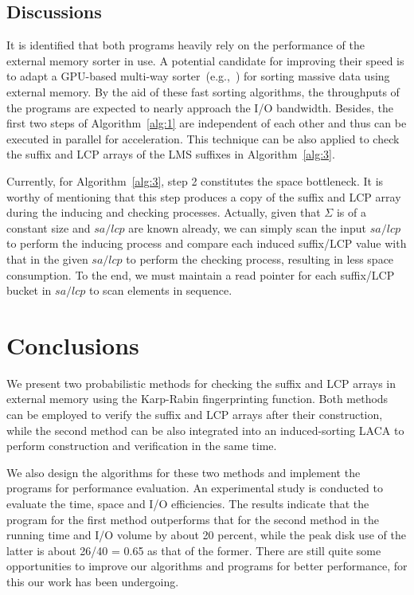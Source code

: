 \documentclass[10pt,journal,compsoc]{IEEEtran}
\begin{document}
	\subsection{Discussions}
	
	It is identified that both programs heavily rely on the performance of the external memory sorter in use. A potential candidate for improving their speed is to adapt a GPU-based multi-way sorter~(e.g.,~\cite{Leischner2010, Davidson2012}) for sorting massive data using external memory. By the aid of these fast sorting algorithms, the throughputs of the programs are expected to nearly approach the I/O bandwidth. Besides, the first two steps of Algorithm~\ref{alg:1} are independent of each other and thus can be executed in parallel for acceleration. This technique can be also applied to check the suffix and LCP arrays of the LMS suffixes in Algorithm~\ref{alg:3}.
	
	Currently, for Algorithm~\ref{alg:3}, step 2 constitutes the space bottleneck. It is worthy of mentioning that this step produces a copy of the suffix and LCP array during the inducing and checking processes. Actually, given that $\Sigma$ is of a constant size and $sa/lcp$ are known already, we can simply scan the input $sa/lcp$ to perform the inducing process and compare each induced suffix/LCP value with that in the given $sa/lcp$ to perform the checking process, resulting in less space consumption. To the end, we must maintain a read pointer for each suffix/LCP bucket in $sa/lcp$ to scan elements in sequence.
	
	\section{Conclusions} \label{sec:conclusion}
	
	We present two probabilistic methods for checking the suffix and LCP arrays in external memory using the Karp-Rabin fingerprinting function. Both methods can be employed to verify the suffix and LCP arrays after their construction, while the second method can be also integrated into an induced-sorting LACA to perform construction and verification in the same time.
	
	We also design the algorithms for these two methods and implement the programs for performance evaluation. An experimental study is conducted to evaluate the time, space and I/O efficiencies.
	The results indicate that the program for the first method outperforms that for the second method in the running time and I/O volume by about 20 percent, while the peak disk use of the latter is about 26/40 = 0.65 as that of the former. There are still quite some opportunities to improve our algorithms and programs for better performance, for this our work has been undergoing.
	
	
	
	
\end{document}

